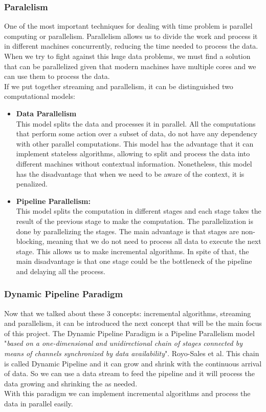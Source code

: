 \subsubsection*{Paralelism}
One of the most important techniques for dealing with time problem is parallel computing or parallelism.
Parallelism allows us to divide the work and process it in different machines concurrently, reducing the time needed to process the data.
When we try to fight against this huge data problems, we must find a solution that can be parallelized given that modern machines have multiple cores and we can use them to process the data.\\
If we put together streaming and parallelism, it can be distinguished two computational models:
\begin{itemize}
    \item \textbf{Data Parallelism} \\ 
        This model splits the data and processes it in parallel.
        All the computations that perform some action over a subset of data, do not have any dependency with other parallel computations.
        This model has the advantage that it can implement stateless algorithms, allowing to split and process the data into different machines without contextual information.
        Nonetheless, this model has the disadvantage that when we need to be aware of the context, it is penalized.
    \item \textbf{Pipeline Parallelism:} \\
        This model splits the computation in different stages and each stage takes the result of the previous stage to make the computation.
        The parallelization is done by parallelizing the stages.
        The main advantage is that stages are non-blocking, meaning that we do not need to process all data to execute the next stage.
        This allows us to make incremental algorithms.
        In spite of that, the main disadvantage is that one stage could be the bottleneck of the pipeline and delaying all the process.
    \end{itemize}
\subsubsection*{Dynamic Pipeline Paradigm}
Now that we talked about these 3 concepts: incremental algorithms, streaming and parallelism, it can be introduced the next concept that will be the main focus of this project.
The Dynamic Pipeline Paradigm \cite{pasarella2024computational} is a Pipeline Parallelism model "\textit{based on a one-dimensional and unidirectional chain of stages connected by means of channels synchronized by data availability}". Royo-Sales et al. \cite[][Page 9, 2.2]{royo_sales_algorithm_2021}
This chain is called Dynamic Pipeline and it can grow and shrink with the continuous arrival of data.
So we can use a data stream to feed the pipeline and it will process the data growing and shrinking the as needed. \\
With this paradigm we can implement incremental algorithms and process the data in parallel easily.

